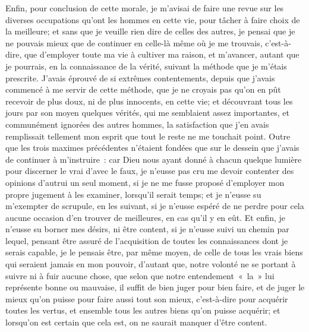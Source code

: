 \documentclass[french,twoside]{book} %
\begin{document}
Enfin, pour conclusion de cette morale, je m'avisai de faire une revue sur les diverses occupations qu'ont les hommes en cette vie, pour tâcher à faire choix de la meilleure; et sans que je veuille rien dire de celles des autres, je pensai que je ne pouvais mieux que de continuer en celle-là même où je me trouvais, c'est-à-dire, que d'employer toute ma vie à cultiver ma raison, et m'avancer, autant que je pourrais, en la connaissance de la vérité, suivant la méthode que je m'étais prescrite. J'avais éprouvé de si extrêmes contentements, depuis que j'avais commencé à me servir de cette méthode, que je ne croyais pas qu'on en pût recevoir de plus doux, ni de plus innocents, en cette vie; et découvrant tous les jours par son moyen quelques vérités, qui me semblaient assez importantes, et communément ignorées des autres hommes, la satisfaction que j'en avais remplissait tellement mon esprit que tout le reste ne me touchait point. Outre que les trois maximes précédentes n'étaient fondées que sur le dessein que j'avais de continuer à m'instruire : car Dieu nous ayant donné à chacun quelque lumière pour discerner le vrai d'avec le faux, je n'eusse pas cru me devoir contenter des opinions d'autrui un seul moment, si je ne me fusse proposé d'employer mon propre jugement à les examiner, lorsqu'il serait temps; et je n'eusse su m'exempter de scrupule, en les suivant, si je n'eusse espéré de ne perdre pour cela aucune occasion d'en trouver de meilleures, en cas qu'il y en eût. Et enfin, je n'eusse su borner mes désirs, ni être content, si je n'eusse suivi un chemin par lequel, pensant être assuré de l'acquisition de toutes les connaissances dont je serais capable, je le pensais être, par même moyen, de celle de tous les vrais biens qui seraient jamais en mon pouvoir, d'autant que, notre volonté ne se portant à suivre ni à fuir aucune chose, que selon que notre entendement « la » lui représente bonne ou mauvaise, il suffit de bien juger pour bien faire, et de juger le mieux qu'on puisse pour faire aussi tout son mieux, c'est-à-dire pour acquérir toutes les vertus, et ensemble tous les autres biens qu'on puisse acquérir; et lorsqu'on est certain que cela est, on ne saurait manquer d'être content.\par
\end{document}
